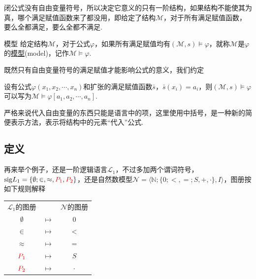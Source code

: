 \documentclass[main.tex]{subfiles}
\begin{document}
闭公式没有自由变量符号，所以决定它意义的只有一阶结构，如果结构不能使其为真，哪个满足赋值函数来了都没用，即给定了结构\(\mathcal{M}\)，对于所有满足赋值函数，要么全都满足，要么全都不满足.

\begin{definition}{模型}
    给定结构\(\mathcal{M}\)，对于公式\(\varphi\)，如果所有满足赋值均有\((\mathcal{M}, s) \vDash \varphi\)，就称\(\mathcal{M}\)是\(\varphi\)的\uline{模型}(model)，记作\(\mathcal{M} \vDash \varphi\). 
\end{definition}

既然只有自由变量符号的满足赋值才能影响公式的意义，我们约定
\begin{reference}
    设有公式\(\varphi(x_1,x_2,\cdots,x_n)\)和扩张的满足赋值函数\(\bar s\)，\(\bar s(x_i)=a_i\)，则\((\mathcal{M},s) \vDash \varphi\)可以写为\(\mathcal{M} \vDash \varphi[a_1,a_2,\cdots,a_n]\).
\end{reference}
严格来说代入自由变量的东西只能是语言中的项，这里使用中括号，是一种新的简便表示方法，表示将结构中的元素“代入”公式. 

\subsection{定义}

再来举个例子，还是一阶逻辑语言\(\mathcal{L_1}\)，不过多加两个谓词符号，\({\rm sig}L_1 = \{\emptyset; \in, \approx, {\color{red}P_1}, {\color{red}P_2}\}\)，还是自然数模型\(\mathcal{N}=\langle \mathbb{N}; \{0; <, =; S, +, \cdot\}, I \rangle\)，图册按如下规则解释
\begin{center}
    \begin{tabular}{ccc}
        \(\mathcal{L}_1\)的图册 & & \(\mathcal{N}\)的图册 \\
        \(\emptyset\) & \(\longmapsto\) & \(0\) \\
        \(\in\) & \(\longmapsto\) & \(<\) \\
        \(\approx\) & \(\longmapsto\) & \(=\) \\
        \({\color{red} P_1}\) & \(\longmapsto\) & \(S\) \\
        \({\color{red} P_2}\) & \(\longmapsto\) & \(\cdot\) 
    \end{tabular}
\end{center}
\end{document}
